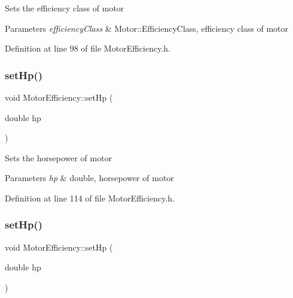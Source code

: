 Sets the efficiency class of motor 
\begin{DoxyParams}{Parameters}
{\em efficiency\+Class} & Motor\+::\+Efficiency\+Class, efficiency class of motor \\
\hline
\end{DoxyParams}


Definition at line 98 of file Motor\+Efficiency.\+h.

\mbox{\label{class_motor_efficiency_a4b86113447665413ddbae115199d9b3f}} 
\subsubsection{\texorpdfstring{set\+Hp()}{setHp()}\hspace{0.1cm}{\footnotesize\ttfamily [1/3]}}
{\footnotesize\ttfamily void Motor\+Efficiency\+::set\+Hp (\begin{DoxyParamCaption}\item[{double}]{hp }\end{DoxyParamCaption})\hspace{0.3cm}{\ttfamily [inline]}}

Sets the horsepower of motor 
\begin{DoxyParams}{Parameters}
{\em hp} & double, horsepower of motor \\
\hline
\end{DoxyParams}


Definition at line 114 of file Motor\+Efficiency.\+h.

\mbox{\label{class_motor_efficiency_a4b86113447665413ddbae115199d9b3f}} 
\subsubsection{\texorpdfstring{set\+Hp()}{setHp()}\hspace{0.1cm}{\footnotesize\ttfamily [2/3]}}
{\footnotesize\ttfamily void Motor\+Efficiency\+::set\+Hp (\begin{DoxyParamCaption}\item[{double}]{hp }\end{DoxyParamCaption})\hspace{0.3cm}{\ttfamily [inline]}}

